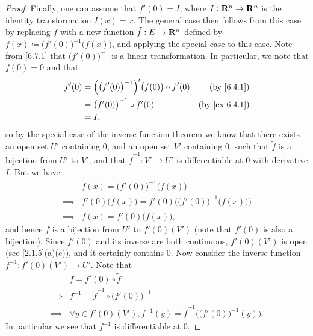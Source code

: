 \begin{proof}
  Finally, one can assume that \(f'(0) = I\), where \(I : \mathbf{R}^n \to \mathbf{R}^n\) is the identity transformation \(I(x) = x\).
  The general case then follows from this case by replacing \(f\) with a new function \(\tilde{f} : E \to \mathbf{R}^n\) defined by \(\tilde{f}(x) \coloneqq \big(f'(0)\big)^{-1} \big(f(x)\big)\), and applying the special case to this case.
  Note from \cref{6.7.1} that \(\big(f'(0)\big)^{-1}\) is a linear transformation.
  In particular, we note that \(\tilde{f}(0) = 0\) and that
  \begin{align*}
    \tilde{f}'(0) & = \Big(\big(f'(0)\big)^{-1}\Big)'\big(f(0)\big) \circ f'(0) & \text{(by \cref{6.4.1})}    \\
                  & = \big(f'(0)\big)^{-1} \circ f'(0)                          & \text{(by \cref{ex 6.4.1})} \\
                  & = I,
  \end{align*}
  so by the special case of the inverse function theorem we know that there exists an open set \(U'\) containing \(0\), and an open set \(V'\) containing \(0\), such that \(\tilde{f}\) is a bijection from \(U'\) to \(V'\), and that \(\tilde{f}^{-1} : V' \to U'\) is differentiable at \(0\) with derivative \(I\).
  But we have
  \begin{align*}
             & \tilde{f}(x) = \big(f'(0)\big)^{-1} \big(f(x)\big)                                 \\
    \implies & f'(0) \big(\tilde{f}(x)\big) = f'(0) \Big(\big(f'(0)\big)^{-1} \big(f(x)\big)\Big) \\
    \implies & f(x) = f'(0) \big(\tilde{f}(x)\big),
  \end{align*}
  and hence \(f\) is a bijection from \(U'\) to \(f'(0)(V')\)
  (note that \(f'(0)\) is also a bijection).
  Since \(f'(0)\) and its inverse are both continuous, \(f'(0)(V')\) is open (see \cref{2.1.5}(a)(c)), and it certainly contains \(0\).
  Now consider the inverse function \(f^{-1} : f'(0)(V') \to U'\).
  Note that
  \begin{align*}
             & f = f'(0) \circ \tilde{f}                                                             \\
    \implies & f^{-1} = \tilde{f}^{-1} \circ \big(f'(0)\big)^{-1}                                    \\
    \implies & \forall y \in f'(0)(V'), f^{-1}(y) = \tilde{f}^{-1}\Big(\big(f'(0)\big)^{-1}(y)\Big).
  \end{align*}
  In particular we see that \(f^{-1}\) is differentiable at \(0\).


\end{proof}
